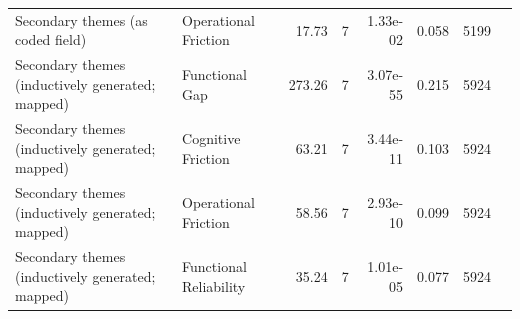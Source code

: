 \begin{table}[t]
\begin{tabular}{llrrrrrr}
Secondary themes (as coded field) & Operational Friction & 17.73 & 7 & 1.33e-02 & 0.058 & 5199 \\
Secondary themes (inductively generated; mapped) & Functional Gap & 273.26 & 7 & 3.07e-55 & 0.215 & 5924 \\
Secondary themes (inductively generated; mapped) & Cognitive Friction & 63.21 & 7 & 3.44e-11 & 0.103 & 5924 \\
Secondary themes (inductively generated; mapped) & Operational Friction & 58.56 & 7 & 2.93e-10 & 0.099 & 5924 \\
Secondary themes (inductively generated; mapped) & Functional Reliability & 35.24 & 7 & 1.01e-05 & 0.077 & 5924 \\
\hline
\end{tabular}
\end{table}